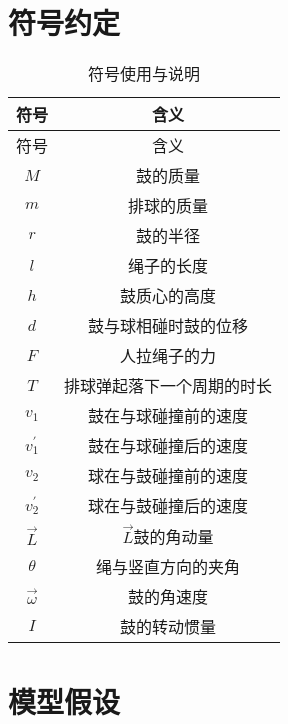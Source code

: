 \documentclass{cumcmthesis}
\begin{document}
\section{符号约定}
\begin{longtable}[c]{cc}
    \caption{符号使用与说明}\label{tab:001}\\
        \toprule[1.5pt] 符号 & 含义\\ \hline \hline \endfirsthead %
        \toprule[1.5pt]  符号 & 含义\\ \hline  \hline \endhead %
        $M$ & 鼓的质量\\
        \hline
        $m$ & 排球的质量\\
        \hline
        $r$ & 鼓的半径\\
        \hline
        $l$ & 绳子的长度\\
        \hline
        $h$ & 鼓质心的高度\\
        \hline
        $d$ & 鼓与球相碰时鼓的位移\\
        \hline
        ${F}$ & 人拉绳子的力\\
        \hline
        $T$ & 排球弹起落下一个周期的时长\\
        \hline
        $v_1$ & 鼓在与球碰撞前的速度\\
        \hline
        $v_1^{'}$ & 鼓在与球碰撞后的速度\\
        \hline
        $v_2$ & 球在与鼓碰撞前的速度\\
        \hline
        $v_2^{'}$ & 球在与鼓碰撞后的速度\\
        \hline
        $\overrightarrow{L}$ & $\overrightarrow{L}$鼓的角动量\\
        \hline
        $\theta$ & 绳与竖直方向的夹角\\
        \hline
        $\overrightarrow{\omega}$ & 鼓的角速度\\
        \hline
        $I$ & 鼓的转动惯量\\
        \bottomrule[1.5pt]
\end{longtable}

\section{模型假设}
\end{document}
